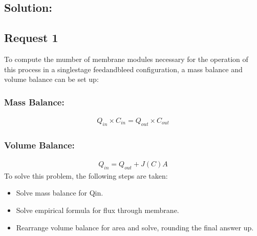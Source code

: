 \documentclass[letterpaper,10pt,english]{jupyterBook}
\begin{document}
\subsection{Solution:}
\label{\detokenize{Exercise_W4_2024_updated:solution}}
\sphinxAtStartPar
{}


\subsection{Request 1}
\label{\detokenize{Exercise_W4_2024_updated:request-1}}
\sphinxAtStartPar
To compute the mumber of membrane modules necessary for the operation of this process in a single\sphinxhyphen{}stage feed\sphinxhyphen{}and\sphinxhyphen{}bleed configuration, a mass balance and volume balance can be set up:


\subsubsection{Mass Balance:}
\label{\detokenize{Exercise_W4_2024_updated:mass-balance}}\begin{equation*}
\begin{split}
Q_{in}\times C_{in}=Q_{out}\times C_{out}
\end{split}
\end{equation*}

\subsubsection{Volume Balance:}
\label{\detokenize{Exercise_W4_2024_updated:volume-balance}}\begin{equation*}
\begin{split}
Q_{in}=Q_{out}+J(C)A
\end{split}
\end{equation*}
\sphinxAtStartPar
To solve this problem, the following steps are taken:
\begin{itemize}
\item {} 
\sphinxAtStartPar
Solve mass balance for Qin.

\item {} 
\sphinxAtStartPar
Solve empirical formula for flux through membrane.

\item {} 
\sphinxAtStartPar
Rearrange volume balance for area and solve, rounding the final answer up.

\end{itemize}
\end{document}
